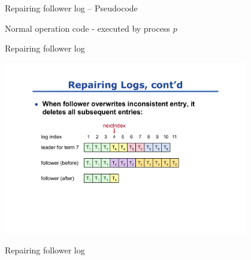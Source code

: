 \begin{frame}{Repairing follower log -- Pseudocode}

\begin{Procedure}
\caption{Normal operation code - executed by process $p$}
\end{Procedure}


\end{frame}

\begin{frame}{Repairing follower log}
	

\begin{center}
\includegraphics[width=0.8\textwidth]{repair-log2}
\end{center}

	
\end{frame}

\begin{frame}{Repairing follower log}

{
\setlength{\interspacetitleruled}{0pt}%
\setlength{\algotitleheightrule}{0pt}%
\begin{Procedure}
\end{Procedure}	
}
	
\end{frame}

